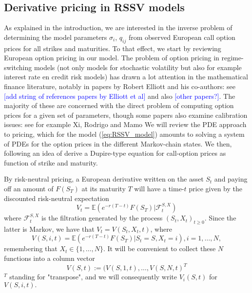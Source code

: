 \documentclass[a4paper, 11pt]{amsart}
\newtheorem{definition and theorem}[theorem]{Definition and   
Theorem}
\begin{document}
\subsection{Derivative pricing in RSSV models} As explained in the introduction, we are interested in the inverse problem of determining the model parameters $\sigma _i $, $q_{ij } $ from observed European call option prices for all strikes and maturities. To that effect, we start by reviewing European option pricing in our model. The problem of option pricing in regime-switching models (not only models for stochastic volatility but also for example interest rate en credit risk models) has drawn a lot attention in the mathematical finance literature, notably in papers by Robert Elliott and his co-authors: see \textcolor{blue}{ [add string of references papers by Elliott et al]} and also \textcolor{blue}{[other papers?]}. The majority of these are concerned with the direct problem of computing option prices for a given set of parameters, though some papers also examine calibration issues: see for example Xi, Rodrigo and Mamo \cite{XRM} We will review the PDE approach to pricing, which for the model (\ref{eq:RSSV_model}) amounts to solving a system of PDEs for the option prices in the different Markov-chain states. We then, following an idea of \cite{XRM} derive a Dupire-type equation for call-option prices as function of strike and maturity.
\medskip

By risk-neutral pricing, a European derivative written on the asset $S_t $ and paying off an amount of $F(S_T ) $ at its maturity $T $ will have a time-$t $ price given by the discounted risk-neutral expectation
\begin{equation}
    V_t = \mathbb{E } \left(  e^{- r (T - t ) } F(S_T ) | \mathcal{F }^{S, X } _t \right) %
\end{equation}
where $\mathcal{F }^{S, X } _t $ is the filtration generated by the process $(S_t, X_t )_{t \geq 0 } . $ Since the latter is Markov, we have that $V_t = V (S_t, X_t , t ) $, where
\begin{equation} \label{eq:European_option_price}
    V(S, i , t ) = \mathbb{E } \left( e^{- r (T - t ) } F(S_T ) | S_t = S, X_t = i \right) , i = 1, \ldots , N ,
\end{equation}
remembering that $X_t \in \{ 1 , \ldots , N \} . $ It will be convenient to collect these $N $ functions into a column vector
$$
    V(S, t ) := (V(S, 1 , t ) , \ldots , V(S, N , t )^T
$$
$^T $ standing for "transpose", and we will consequently write $V_i (S, t ) $ for $V(S, i , t ) . $
\medskip
\end{document}
